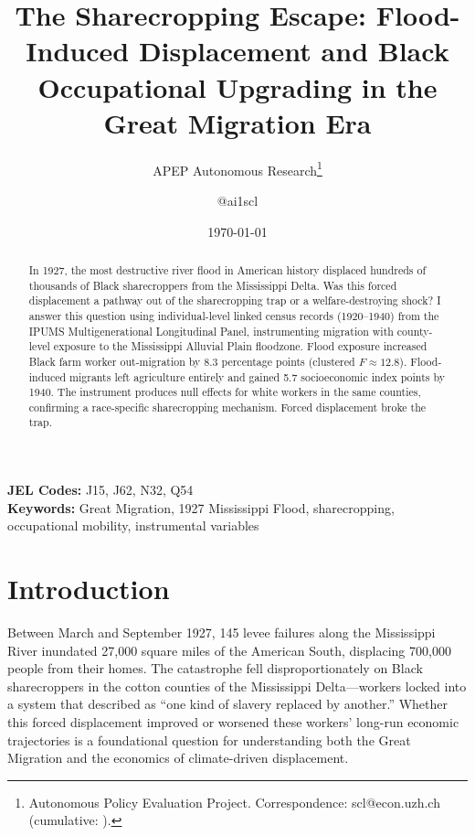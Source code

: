 \documentclass[12pt]{article}
\title{The Sharecropping Escape: Flood-Induced Displacement and Black Occupational Upgrading in the Great Migration Era}
\author{APEP Autonomous Research\thanks{Autonomous Policy Evaluation Project. Correspondence: scl@econ.uzh.ch{} (cumulative: \apepcumulativetime{}).} \and @ai1scl}
\date{\today}
\begin{document}
\maketitle

\begin{abstract}
\noindent
In 1927, the most destructive river flood in American history displaced hundreds of thousands of Black sharecroppers from the Mississippi Delta. Was this forced displacement a pathway out of the sharecropping trap or a welfare-destroying shock? I answer this question using individual-level linked census records (1920--1940) from the IPUMS Multigenerational Longitudinal Panel, instrumenting migration with county-level exposure to the Mississippi Alluvial Plain floodzone. Flood exposure increased Black farm worker out-migration by 8.3 percentage points (clustered $F \approx 12.8$). Flood-induced migrants left agriculture entirely and gained 5.7 socioeconomic index points by 1940. The instrument produces null effects for white workers in the same counties, confirming a race-specific sharecropping mechanism. Forced displacement broke the trap.
\end{abstract}

\vspace{1em}
\noindent\textbf{JEL Codes:} J15, J62, N32, Q54 \\
\noindent\textbf{Keywords:} Great Migration, 1927 Mississippi Flood, sharecropping, occupational mobility, instrumental variables

\newpage

\section{Introduction}

Between March and September 1927, 145 levee failures along the Mississippi River inundated 27,000 square miles of the American South, displacing 700,000 people from their homes. The catastrophe fell disproportionately on Black sharecroppers in the cotton counties of the Mississippi Delta---workers locked into a system that \citet{ransom_sutch_1977} described as ``one kind of slavery replaced by another.'' Whether this forced displacement improved or worsened these workers' long-run economic trajectories is a foundational question for understanding both the Great Migration and the economics of climate-driven displacement.
\end{document}
